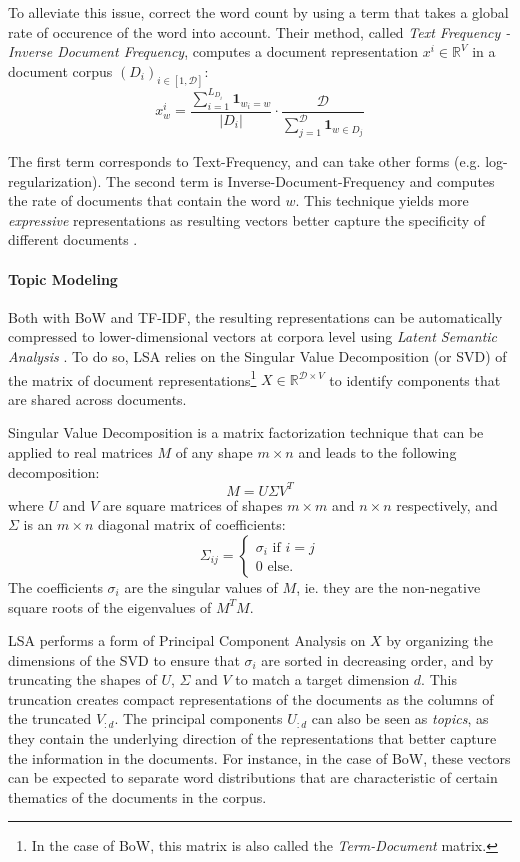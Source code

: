 To alleviate this issue, \citet{tf_idf} correct the word count by using a term that takes a global rate of occurence of the word into account. Their method, called \textit{Text Frequency - Inverse Document Frequency}, computes a document representation $x^i \in \mathbb{R}^V$ in a document corpus $(D_i)_{i \in [1, \mathcal{D}]}$:
$$
x^i_w = \frac{\sum_{i=1}^{L_{D_i}} \mathbf{1}_{w_i = w}}{|D_i|} \cdot \frac{\mathcal{D}}{\sum_{j=1}^{\mathcal{D}} \mathbf{1}_{w \in D_j}}
$$

The first term corresponds to Text-Frequency, and can take other forms (e.g. log-regularization). The second term is Inverse-Document-Frequency and computes the rate of documents that contain the word $w$. This technique yields more \textit{expressive} representations as resulting vectors better capture the specificity of different documents \citep{ramos2003using}.

\paragraph*{Topic Modeling}

Both with BoW and TF-IDF, the resulting representations can be automatically compressed to lower-dimensional vectors at corpora level using \textit{Latent Semantic Analysis} \citep{deerwester1990indexing}. To do so, LSA relies on the Singular Value Decomposition (or SVD) of the matrix of document representations\footnote{In the case of BoW, this matrix is also called the \textit{Term-Document} matrix.} $X \in \mathbb{R}^{\mathcal{D} \times V}$ to identify components that are shared across documents.

Singular Value Decomposition is a matrix factorization technique that can be applied to real matrices $M$ of any shape $m \times n$ and leads to the following decomposition:
$$
M = U \Sigma V^T
$$
where $U$ and $V$ are square matrices of shapes $m \times m$ and $n \times n$ respectively, and $\Sigma$ is an $m \times n$ diagonal matrix of coefficients:
\begin{equation*}
  \Sigma_{ij} = \begin{cases}
    \sigma_i \text{ if } i=j \\
    0 \text{ else.}
  \end{cases}
\end{equation*}
The coefficients $\sigma_i$ are the singular values of $M$, ie. they are the non-negative square roots of the eigenvalues of $M^TM$.

LSA performs a form of Principal Component Analysis on $X$ by organizing the dimensions of the SVD to ensure that $\sigma_i$ are sorted in decreasing order, and by truncating the shapes of $U$, $\Sigma$ and $V$ to match a target dimension $d$. This truncation creates compact representations of the documents as the columns of the truncated $V_{:d}$. The principal components $U_{:d}$ can also be seen as \textit{topics}, as they contain the underlying direction of the representations that better capture the information in the documents. For instance, in the case of BoW, these vectors can be expected to separate word distributions that are characteristic of certain thematics of the documents in the corpus.

